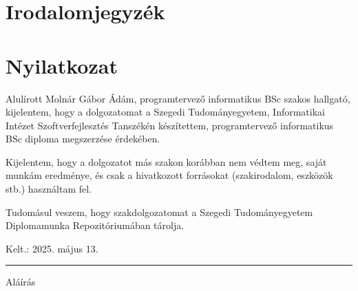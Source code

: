 \documentclass[12pt]{report} %
\begin{document}
\chapter*{Irodalomjegyzék} %

\printbibliography[heading=none] %

\chapter*{Nyilatkozat} %

Alulírott Molnár Gábor Ádám, programtervező informatikus BSc szakos hallgató, kijelentem, hogy a dolgozatomat a Szegedi Tudományegyetem, Informatikai Intézet Szoftverfejlesztés Tanszékén készítettem, programtervező informatikus BSc diploma megszerzése érdekében.

Kijelentem, hogy a dolgozatot más szakon korábban nem védtem meg, saját munkám eredménye, és csak a hivatkozott forrásokat (szakirodalom, eszközök stb.) használtam fel.

Tudomásul veszem, hogy szakdolgozatomat a Szegedi Tudományegyetem Diplomamunka Repozitóriumában tárolja.

\vspace{1cm}

{\large Kelt.: 2025. május 13.}

\vspace{0.5cm}
\hfill
\parbox{5cm}{\centering\hrule\vspace{0.3cm} Aláírás}
\end{document}
